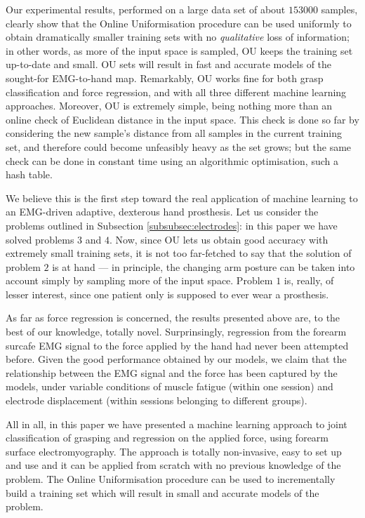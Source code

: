 Our experimental results, performed on a large data set of about
$153000$ samples, clearly show that the Online Uniformisation
procedure can be used uniformly to obtain dramatically smaller
training sets with no \emph{qualitative} loss of information; in other
words, as more of the input space is sampled, OU keeps the training
set up-to-date and small. OU sets will result in fast and accurate
models of the sought-for EMG-to-hand map. Remarkably, OU works fine
for both grasp classification and force regression, and with all three
different machine learning approaches. Moreover, OU is extremely
simple, being nothing more than an online check of Euclidean distance
in the input space. This check is done so far by considering the new
sample's distance from all samples in the current training set, and
therefore could become unfeasibly heavy as the set grows; but the same
check can be done in constant time using an algorithmic optimisation,
such a hash table.

We believe this is the first step toward the real application of
machine learning to an EMG-driven adaptive, dexterous hand
prosthesis. Let us consider the problems outlined in Subsection
\ref{subsubsec:electrodes}: in this paper we have solved problems
$3$ and $4$. Now, since OU lets us obtain good accuracy with extremely
small training sets, it is not too far-fetched to say that the
solution of problem $2$ is at hand --- in principle, the changing arm
posture can be taken into account simply by sampling more of the input
space. Problem $1$ is, really, of lesser interest, since one patient
only is supposed to ever wear a prosthesis.

As far as force regression is concerned, the results presented above
are, to the best of our knowledge, totally novel. Surprinsingly,
regression from the forearm surcafe EMG signal to the force applied by
the hand had never been attempted before. Given the good performance
obtained by our models, we claim that the relationship between the EMG
signal and the force has been captured by the models, under variable
conditions of muscle fatigue (within one session) and electrode
displacement (within sessions belonging to different groups).

All in all, in this paper we have presented a machine learning
approach to joint classification of grasping and regression on the
applied force, using forearm surface electromyography. The approach is
totally non-invasive, easy to set up and use and it can be applied
from scratch with no previous knowledge of the problem. The Online
Uniformisation procedure can be used to incrementally build a training
set which will result in small and accurate models of the problem.


